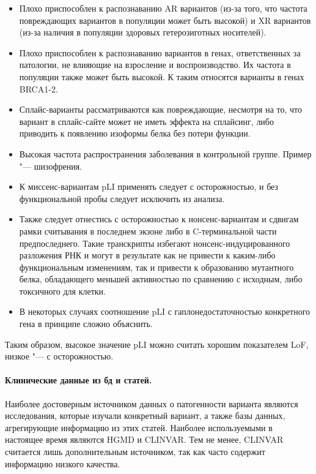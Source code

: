 \documentclass[a4paper,12pt]{article}
\begin{document}
\begin{itemize}
\item Плохо приспособлен к распознаванию AR вариантов (из-за того, что частота повреждающих вариантов в популяции может быть высокой) и XR вариантов (из-за наличия в популяции здоровых гетерозиготных носителей).
\item Плохо приспособлен к распознаванию вариантов в генах, ответственных за патологии, не влияющие на взросление и воспроизводство.
Их частота в популяции также может быть высокой.
К таким относятся варианты в генах BRCA1-2.
\item Сплайс-варианты рассматриваются как повреждающие, несмотря на то, что вариант в сплайс-сайте может не иметь эффекта на сплайсинг, либо приводить к появлению изоформы белка без потери функции.
\item Высокая частота распространения заболевания в контрольной группе.
Пример "--- шизофрения.
\item К миссенс-вариантам pLI применять следует с осторожностью, и без функциональной пробы следует исключить из анализа.
\item Также следует отнестись с осторожностью к нонсенс-вариантам и сдвигам рамки считывания в последнем экзоне либо в C-терминальной части предпоследнего.
Такие транскрипты избегают нонсенс-индуцированного разложения РНК и могут в результате как не привести к каким-либо функциональным изменениям, так и привести к образованию мутантного белка, обладающего меньшей активностью по сравнению с исходным, либо токсичного для клетки.
\item В некоторых случаях соотношение pLI с гаплонедостаточностью конкретного гена в принципе сложно объяснить.
\end{itemize}

Таким образом, высокое значение pLI можно считать хорошим показателем LoF, низкое "--- с осторожностью.

\paragraph{Клинические данные из бд и статей.}
Наиболее достоверным источником данных о патогенности варианта являются исследования, которые изучали конкретный вариант, а также базы данных, агрегирующие информацию из этих статей.
Наиболее используемыми в настоящее время являются HGMD\cite{hgmd} и CLINVAR.
Тем не менее, CLINVAR считается лишь дополнительным источником, так как часто содержит информацию низкого качества\cite{ryzhkova}.
\end{document}
